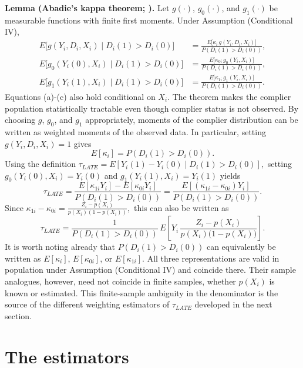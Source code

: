 \documentclass[12pt, a4paper, oneside]{article}
\theoremstyle{plain}
\theoremstyle{definition}
\begin{document}
\textbf{Lemma (Abadie's kappa theorem; \citealp{abadie2003semiparametric}).} Let $g(\cdot)$, $g_0(\cdot)$, and $g_1(\cdot)$ be measurable functions with finite first moments. Under Assumption (Conditional IV),
\begin{align}
    E\big[g(Y_i,D_i,X_i)\mid D_i(1)>D_i(0)\big] &= \frac{E\big[\kappa_i\, g(Y_i,D_i,X_i)\big]}{P(D_i(1)>D_i(0))}, \tag{a}\\
    E\big[g_0(Y_i(0),X_i)\mid D_i(1)>D_i(0)\big] &= \frac{E\big[\kappa_{0i}\, g_0(Y_i,X_i)\big]}{P(D_i(1)>D_i(0))}, \tag{b}\\
    E\big[g_1(Y_i(1),X_i)\mid D_i(1)>D_i(0)\big] &= \frac{E\big[\kappa_{1i}\, g_1(Y_i,X_i)\big]}{P(D_i(1)>D_i(0))}. \tag{c}
\end{align}
Equations (a)-(c) also hold conditional on $X_i$.
The theorem makes the complier population statistically tractable even though complier
status is not observed.
 By choosing \(g\), \(g_0\), and \(g_1\) appropriately, moments of the
complier distribution can be written as weighted moments of the observed data.
In particular, setting \(g(Y_i,D_i,X_i)=1\) gives
\begin{equation}
    E[\kappa_i]=P(D_i(1)>D_i(0)).
\end{equation}
Using the definition
$\tau_{LATE}=E[Y_i(1)-Y_i(0)\mid D_i(1)>D_i(0)],$
setting $g_0(Y_i(0),X_i)=Y_i(0)$ and
$g_1(Y_i(1),X_i)=Y_i(1)$ yields
\begin{equation}
    \tau_{LATE}
    =
    \frac{E[\kappa_{1i}Y_i]-E[\kappa_{0i}Y_i]}
    {P(D_i(1)>D_i(0))}
    =
    \frac{E[(\kappa_{1i}-\kappa_{0i})Y_i]}
    {P(D_i(1)>D_i(0))}.
\end{equation}
Since $
\kappa_{1i}-\kappa_{0i}
=
\frac{Z_i-p(X_i)}{p(X_i)(1-p(X_i))},
$ this can also be written as
\begin{equation}
    \tau_{LATE} = \frac{1}{P(D_i(1)>D_i(0))}\,E\!\left[Y_i\,\frac{Z_i-p(X_i)}{p(X_i)\big(1-p(X_i)\big)}\right].
\end{equation}
It is worth noting already that $P(D_i(1)>D_i(0))$ can equivalently be written as
$E[\kappa_i]$, $E[\kappa_{0i}]$, or $E[\kappa_{1i}]$. All three representations are valid
in population under Assumption (Conditional IV) and coincide there. Their sample
analogues, however, need not coincide in finite samples, whether $p(X_i)$ is known or
estimated. This finite-sample ambiguity in the denominator is the source of the different
weighting estimators of $\tau_{LATE}$ developed in the next section.

\section{The estimators}
\end{document}
